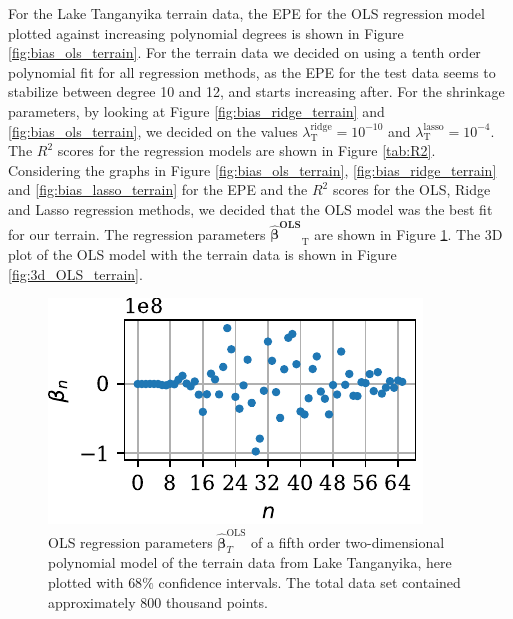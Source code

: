 \documentclass[a4paper, 10pt]{article}
\begin{document}
\begin{multicols}{2}
\noindent
For the Lake Tanganyika  terrain data, the EPE for the OLS regression model plotted against increasing polynomial degrees is shown in Figure \ref{fig:bias_ols_terrain}. For the terrain data we decided on using a tenth order polynomial fit for all regression methods, as the EPE for the test data seems to stabilize between degree 10 and 12, and starts increasing after.  For the shrinkage parameters, by looking at Figure \ref{fig:bias_ridge_terrain} and \ref{fig:bias_ols_terrain}, we decided on the values  $\lambda^\text{ridge}_\text{T}=10^{-10} $ and $\lambda^\text{lasso}_\text{T}=10^{-4} $.
The $R^2$ scores for the regression models  are shown in Figure \ref{tab:R2}. Considering the graphs in Figure \ref{fig:bias_ols_terrain}, \ref{fig:bias_ridge_terrain} and \ref{fig:bias_lasso_terrain} for the EPE  and the $R^2$ scores for the OLS, Ridge and Lasso regression methods, we decided that the OLS model was the best fit for our terrain.  The regression parameters $\bm{\hat{\beta}^\text{OLS}}_\text{T}$ are shown in Figure \ref{fig:beta_variance_terrain}. The 3D plot of the OLS model with the terrain data is shown in Figure \ref{fig:3d_OLS_terrain}.

\begin{figure}[H]
    \includegraphics[scale=1]{figs/beta_variance_ols_terrain.pdf}
    \caption{OLS regression parameters $\bm{\hat{\beta}}^{\text{OLS}}_T$  of a fifth order two-dimensional polynomial model  of the terrain data from Lake Tanganyika, here plotted with $68\%$ confidence intervals. The total data set contained approximately 800 thousand points.}
    \label{fig:beta_variance_terrain}
\end{figure}

\end{multicols}
\end{document}
